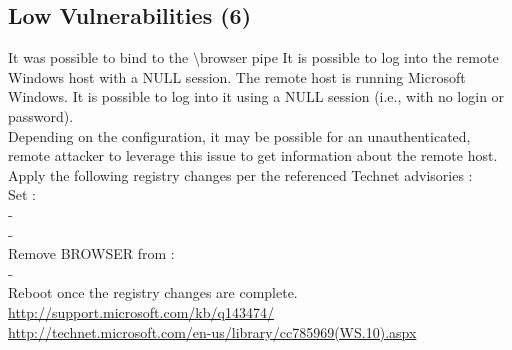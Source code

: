 \subsection{Low Vulnerabilities (6)}
\begin{tcolorbox}[
	title=Communication is not secure,
	colback=blue!5!white,
	colframe=blue!75!black,
	subtitle style={boxrule=0.4pt, colback=blue!50!white}	
	] 
	It was possible to bind to the \textbackslash browser pipe
It is possible to log into the remote Windows host with a NULL session.
The remote host is running Microsoft Windows. It is possible to log into it using a NULL session (i.e., with no login or password).\\
Depending on the configuration, it may be possible for an unauthenticated, remote attacker to leverage this issue to get information about the remote host.
Apply the following registry changes per the referenced Technet advisories :\\
Set :\\
-\\
-\\
Remove BROWSER from :\\
-\\ 
Reboot once the registry changes are complete.
\url{http://support.microsoft.com/kb/q143474/}\\
\url{http://technet.microsoft.com/en-us/library/cc785969(WS.10).aspx}
\end{tcolorbox}

